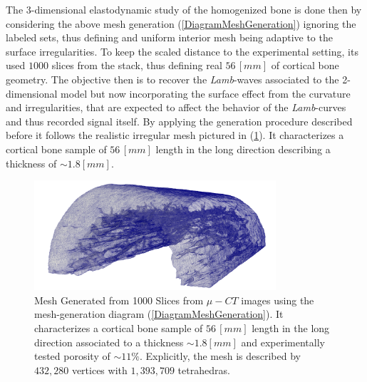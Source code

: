 The 3-dimensional elastodynamic study of the homogenized bone is done then by considering the above mesh generation (\ref{DiagramMeshGeneration}) ignoring the labeled sets, thus defining and uniform interior mesh being adaptive to the surface irregularities.
To keep the scaled distance to the experimental setting, its used $1000$ slices from the stack, thus defining real $56 \, [mm]$ of cortical bone geometry.
The objective then is to recover the \textit{Lamb}-waves associated to the 2-dimensional model but now incorporating the surface effect from the curvature and irregularities, that are expected to affect the behavior of the \textit{Lamb}-curves and thus recorded signal itself.
By applying the generation procedure described before it follows the realistic irregular mesh pictured in (\ref{HomBoneMeshFile}). It characterizes a cortical bone sample of $56 \, [mm]$ length in the long direction describing a thickness of $\sim 1.8 [mm]$. 

\begin{figure}[!h]
	\centering
	\includegraphics[width=0.8\textwidth]{images/ImgExt/CorticalBoneS1000OPT20-View.png}
	\caption{Mesh Generated from 1000 Slices from $\mu-CT$ images using the mesh-generation diagram (\ref{DiagramMeshGeneration}). It characterizes a cortical bone sample of $56 \, [mm]$ length in the long direction associated to a thickness $\sim 1.8 [mm]$ and experimentally tested porosity of $\sim 11 \%$. Explicitly, the mesh is described by $432,280$ vertices with $1,393,709$ tetrahedras.}
	\label{HomBoneMeshFile}
\end{figure} 

